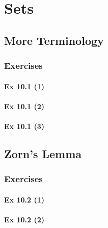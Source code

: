 \setcounter{chapter}{0}
\renewcommand{\thechapter}{10}
\chapter{Sets}\label{ch:10}
\setcounter{equation}{0}	        %

\section{More Terminology}\label{sec:10.1}
\subsection{Exercises}\label{sec:10.1_Exercises}

\subsubsection{Ex 10.1 (1)}\label{sec:Ex_10.1.1}

\subsubsection{Ex 10.1 (2)}\label{sec:Ex_10.1.2}

\subsubsection{Ex 10.1 (3)}\label{sec:Ex_10.1.3}

\newpage		%

\section{Zorn's Lemma}\label{sec:10.2}
\subsection{Exercises}\label{sec:10.2_Exercises}

\subsubsection{Ex 10.2 (1)}\label{sec:Ex_10.2.1}

\subsubsection{Ex 10.2 (2)}\label{sec:Ex_10.2.2}

